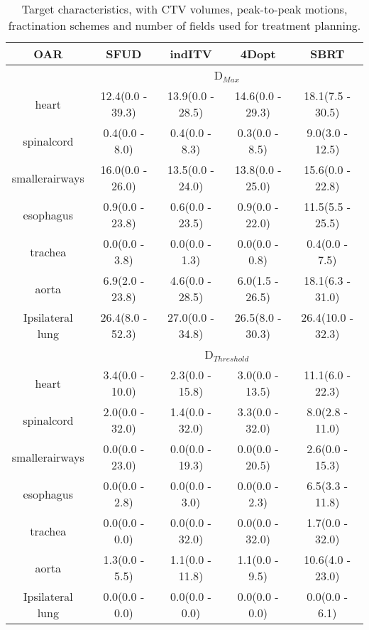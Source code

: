 \begin{table}[H]
	\centering
	\caption{Target characteristics, with CTV volumes, peak-to-peak motions, fractination schemes and number of fields used for treatment planning.}
	\begin{tabular}{c|c|c|c|c}
		\hline\hline
		 
		OAR & SFUD & indITV & 4Dopt & SBRT \\
		\hline
		& \multicolumn{4}{c}{D$_{Max}$} \\
		\hline
heart & 12.4(0.0 - 39.3) & 13.9(0.0 - 28.5) & 14.6(0.0 - 29.3) & 18.1(7.5 - 30.5)\\ 
spinalcord & 0.4(0.0 - 8.0) & 0.4(0.0 - 8.3) & 0.3(0.0 - 8.5) & 9.0(3.0 - 12.5)\\ 
smallerairways & 16.0(0.0 - 26.0) & 13.5(0.0 - 24.0) & 13.8(0.0 - 25.0) & 15.6(0.0 - 22.8)\\ 
esophagus & 0.9(0.0 - 23.8) & 0.6(0.0 - 23.5) & 0.9(0.0 - 22.0) & 11.5(5.5 - 25.5)\\ 
trachea & 0.0(0.0 - 3.8) & 0.0(0.0 - 1.3) & 0.0(0.0 - 0.8) & 0.4(0.0 - 7.5)\\ 
aorta & 6.9(2.0 - 23.8) & 4.6(0.0 - 28.5) & 6.0(1.5 - 26.5) & 18.1(6.3 - 31.0)\\ 
Ipsilateral lung & 26.4(8.0 - 52.3) & 27.0(0.0 - 34.8) & 26.5(8.0 - 30.3) & 26.4(10.0 - 32.3)\\ 

\hline\hline
& \multicolumn{4}{c}{D$_{Threshold}$} \\
\hline

heart & 3.4(0.0 - 10.0) & 2.3(0.0 - 15.8) & 3.0(0.0 - 13.5) & 11.1(6.0 - 22.3)\\ 
spinalcord & 2.0(0.0 - 32.0) & 1.4(0.0 - 32.0) & 3.3(0.0 - 32.0) & 8.0(2.8 - 11.0)\\ 
smallerairways & 0.0(0.0 - 23.0) & 0.0(0.0 - 19.3) & 0.0(0.0 - 20.5) & 2.6(0.0 - 15.3)\\ 
esophagus & 0.0(0.0 - 2.8) & 0.0(0.0 - 3.0) & 0.0(0.0 - 2.3) & 6.5(3.3 - 11.8)\\ 
trachea & 0.0(0.0 - 0.0) & 0.0(0.0 - 32.0) & 0.0(0.0 - 32.0) & 1.7(0.0 - 32.0)\\ 
aorta & 1.3(0.0 - 5.5) & 1.1(0.0 - 11.8) & 1.1(0.0 - 9.5) & 10.6(4.0 - 23.0)\\ 
Ipsilateral lung & 0.0(0.0 - 0.0) & 0.0(0.0 - 0.0) & 0.0(0.0 - 0.0) & 0.0(0.0 - 6.1)\\ 


\hline\hline

	\end{tabular}
	\label{tab:OARComplex}
\end{table}